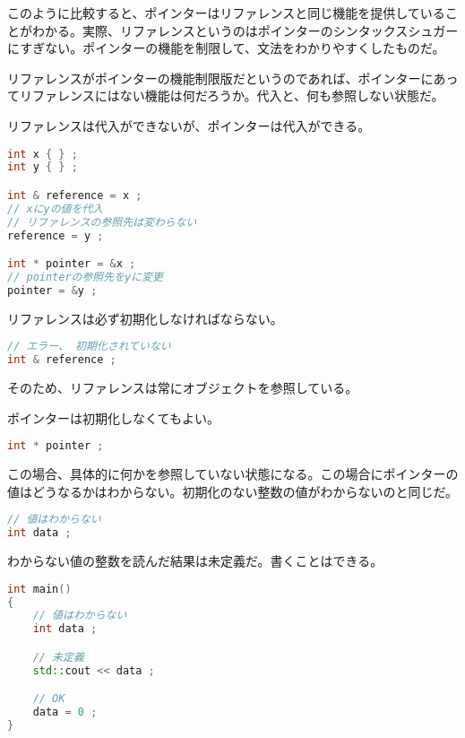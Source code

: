 このように比較すると、ポインターはリファレンスと同じ機能を提供していることがわかる。実際、リファレンスというのはポインターのシンタックスシュガーにすぎない。ポインターの機能を制限して、文法をわかりやすくしたものだ。


リファレンスがポインターの機能制限版だというのであれば、ポインターにあってリファレンスにはない機能は何だろうか。代入と、何も参照しない状態だ。


リファレンスは代入ができないが、ポインターは代入ができる。

\begin{lstlisting}[language={C++}]
int x { } ;
int y { } ;

int & reference = x ;
// xにyの値を代入
// リファレンスの参照先は変わらない
reference = y ;

int * pointer = &x ;
// pointerの参照先をyに変更
pointer = &y ;
\end{lstlisting}


リファレンスは必ず初期化しなければならない。

\begin{lstlisting}[language={C++}]
// エラー、 初期化されていない
int & reference ; 
\end{lstlisting}

そのため、リファレンスは常にオブジェクトを参照している。

ポインターは初期化しなくてもよい。

\begin{lstlisting}[language={C++}]
int * pointer ;
\end{lstlisting}

この場合、具体的に何かを参照していない状態になる。この場合にポインターの値はどうなるかはわからない。初期化のない整数の値がわからないのと同じだ。

\begin{lstlisting}[language={C++}]
// 値はわからない
int data ;
\end{lstlisting}

わからない値の整数を読んだ結果は未定義だ。書くことはできる。

\begin{lstlisting}[language={C++}]
int main()
{
    // 値はわからない
    int data ; 

    // 未定義
    std::cout << data ;

    // OK
    data = 0 ;
}
\end{lstlisting}

